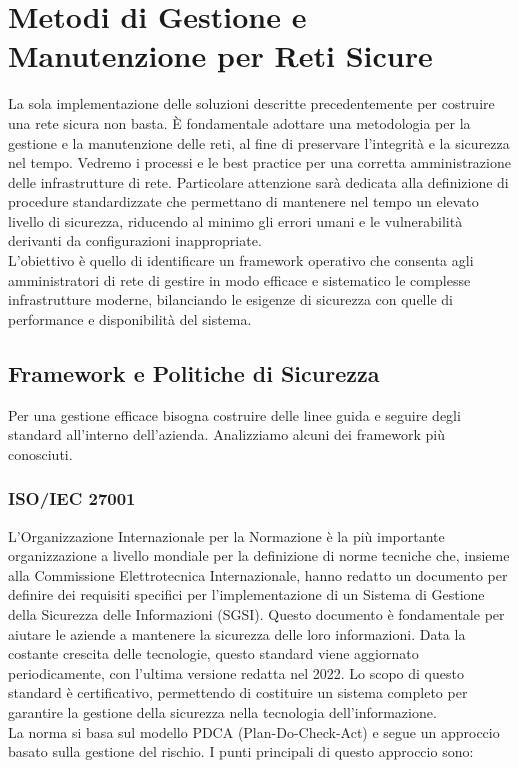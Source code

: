\hypersetup{linkcolor=blue, citecolor=red}

\chapter{Metodi di Gestione e Manutenzione per Reti Sicure} \label{chap:3}

La sola implementazione delle soluzioni descritte precedentemente per costruire una rete sicura non basta. È fondamentale adottare una metodologia per la gestione e la manutenzione delle reti, al fine di preservare l'integrità e la sicurezza nel tempo.
Vedremo i processi e le best practice per una corretta amministrazione delle infrastrutture di rete. Particolare attenzione sarà dedicata alla definizione di procedure standardizzate che permettano di mantenere nel tempo un elevato livello di sicurezza, riducendo al minimo gli errori umani e le vulnerabilità derivanti da configurazioni inappropriate.\\
L'obiettivo è quello di identificare un framework operativo che consenta agli amministratori di rete di gestire in modo efficace e sistematico le complesse infrastrutture moderne, bilanciando le esigenze di sicurezza con quelle di performance e disponibilità del sistema.


\section{Framework e Politiche di Sicurezza}
Per una gestione efficace bisogna costruire delle linee guida e seguire degli standard all'interno dell'azienda. Analizziamo alcuni dei framework più conosciuti.
    \subsection{ISO/IEC 27001}
    L'Organizzazione Internazionale per la Normazione è la più importante organizzazione a livello mondiale per la definizione di norme tecniche che, insieme alla Commissione Elettrotecnica Internazionale, hanno redatto un documento per definire dei requisiti specifici per l'implementazione di un Sistema di Gestione della Sicurezza delle Informazioni (SGSI). Questo documento è fondamentale per aiutare le aziende a mantenere la sicurezza delle loro informazioni. 
    Data la costante crescita delle tecnologie, questo standard viene aggiornato periodicamente, con l'ultima versione redatta nel 2022. Lo scopo di questo standard è certificativo, permettendo di costituire un sistema completo per garantire la gestione della sicurezza nella tecnologia dell'informazione. \\
     La norma  si basa sul modello PDCA (Plan-Do-Check-Act) e segue un approccio basato sulla gestione del rischio. I punti principali di questo approccio sono:
     
